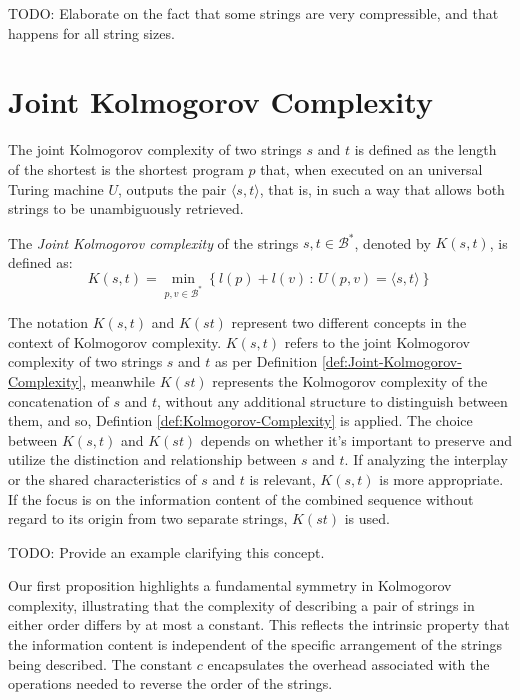 {\color{red} TODO: Elaborate on the fact that some strings are very compressible, and that happens for all string sizes.}


%
%

\section{Joint Kolmogorov Complexity}

The joint Kolmogorov complexity of two strings $s$ and $t$ is defined as the length of the shortest is the shortest program $p$ that, when executed on an universal Turing machine $U$, outputs the pair $\langle s, t \rangle$, that is, in such a way that allows both strings to be unambiguously retrieved.

\begin{definition}
\label{def:Joint-Kolmogorov-Complexity}
The \emph{Joint Kolmogorov complexity} of the strings $s, t \in \mathcal{B}^\ast$, denoted by $K(s, t)$, is defined as:
\[
K(s, t)=\min_{p,v \in \mathcal{B}^\ast}\left\{l(p) + l(v)\,:\, U(p,v)=\langle s, t \rangle \right\}
\]
\end{definition}

The notation $K(s, t)$ and $K(st)$ represent two different concepts in the context of Kolmogorov complexity. $K(s, t)$ refers to the joint Kolmogorov complexity of two strings $s$ and $t$ as per Definition \ref{def:Joint-Kolmogorov-Complexity}, meanwhile $K(st)$ represents the Kolmogorov complexity of the concatenation of $s$ and $t$, without any additional structure to distinguish between them, and so, Defintion \ref{def:Kolmogorov-Complexity} is applied. The choice between $K(s, t)$ and $K(st)$ depends on whether it's important to preserve and utilize the distinction and relationship between $s$ and $t$. If analyzing the interplay or the shared characteristics of $s$ and $t$ is relevant, $K(s, t)$ is more appropriate. If the focus is on the information content of the combined sequence without regard to its origin from two separate strings, $K(st)$ is used.

\begin{example}
{\color{red} TODO: Provide an example clarifying this concept.}
\end{example}

Our first proposition highlights a fundamental symmetry in Kolmogorov complexity, illustrating that the complexity of describing a pair of strings in either order differs by at most a constant. This reflects the intrinsic property that the information content is independent of the specific arrangement of the strings being described. The constant \(c\) encapsulates the overhead associated with the operations needed to reverse the order of the strings.


